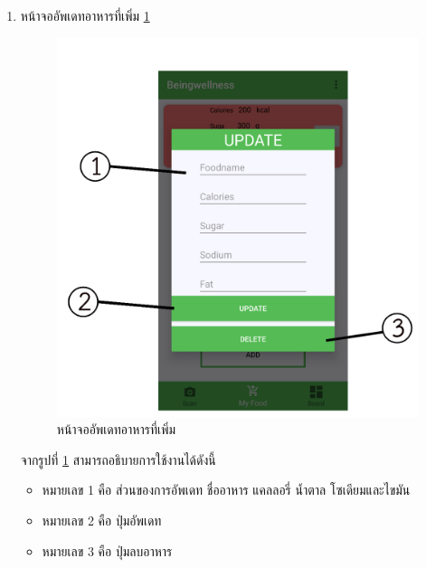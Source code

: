 \begin{enumerate}
\begin{itemize}[label={--}]
										\end{itemize}


									\item  หน้าจออัพเดทอาหารที่เพิ่ม \ref{Fig:upfood}
									\begin{figure}[H]
										\centering
										\includegraphics[width=0.5\columnwidth]{Figures/7/teach/12.png}
										\caption{หน้าจออัพเดทอาหารที่เพิ่ม}
										\label{Fig:upfood}
									\end{figure}
									จากรูปที่ \ref{Fig:upfood} สามารถอธิบายการใช้งานได้ดังนี้
									\begin{itemize}[label={--}]
										\item หมายเลข 1 คือ ส่วนของการอัพเดท ชื่ออาหาร แคลลอรี่  น้ำตาล โซเดียมและไขมัน
										\item หมายเลข 2 คือ  ปุ่มอัพเดท
										\item หมายเลข 3 คือ ปุ่มลบอาหาร
									
										\end{itemize}
	\end{enumerate}
				
